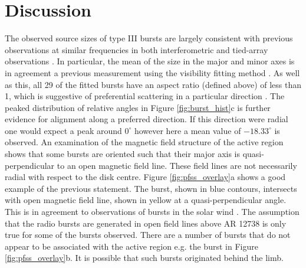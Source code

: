 
\section{Discussion}
\label{sec:obsvtheory_discussion}
The observed source sizes of type III bursts are largely consistent with previous observations at similar frequencies in both interferometric and tied-array observations \citep{Kontar2017, Zhang2020}. In particular, the mean of the size in the major and minor axes is in agreement a previous measurement using the visibility fitting method \citep{Murphy2021}. As well as this, all 29 of the fitted bursts have an aspect ratio (defined above) of less than 1, which is suggestive of preferential scattering in a particular direction \citep{Anantharamaiah1994, Bastian1994}. The peaked distribution of relative angles in Figure \ref{fig:burst_hist}c is further evidence for alignment along a preferred direction. If this direction were radial one would expect a peak around $0^\circ$ however here a mean value of $-18.33^\circ$ is observed. An examination of the magnetic field structure of the active region shows that some bursts are oriented such that their major axis is quasi-perpendicular to an open magnetic field line. These field lines are not necessarily radial with respect to the disk centre. Figure \ref{fig:pfss_overlay}a shows a good example of the previous statement. The burst, shown in blue contours, intersects with open magnetic field line, shown in yellow at a quasi-perpendicular angle. This is in agreement to observations of bursts in the solar wind \citep{Anantharamaiah1994, SasikumarRaja2016}. The assumption that the radio bursts are generated in open field lines above AR 12738 is only true for some of the bursts observed. There are a number of bursts that do not appear to be associated with the active region e.g. the burst in Figure \ref{fig:pfss_overlay}b. It is possible that such bursts originated behind the limb. %

